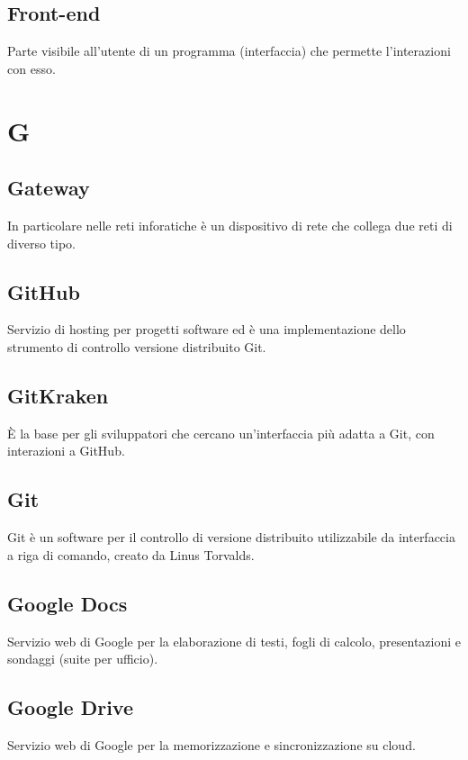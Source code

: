 \documentclass{classes/base}
\begin{document}
        \subsection*{Front-end}
        Parte visibile all'utente di un programma (interfaccia) che permette l'interazioni con esso.
        
        \newpage  
    \section{G}
        
        \subsection*{Gateway}
        In particolare nelle reti inforatiche è un dispositivo di rete che collega due reti di diverso tipo.

        \subsection*{GitHub}
        Servizio di hosting per progetti software ed è una implementazione dello strumento di controllo versione distribuito Git.

        \subsection*{GitKraken}
        È la base per gli sviluppatori che cercano un'interfaccia più adatta a Git, con interazioni a GitHub. 

        \subsection*{Git}
        Git è un software per il controllo di versione distribuito utilizzabile da interfaccia a riga di comando, creato da Linus Torvalds.
        
        \subsection*{Google Docs}
        Servizio web di Google per la elaborazione di testi, fogli di calcolo, presentazioni e sondaggi (suite per ufficio).
        
        \subsection*{Google Drive}
        Servizio web di Google per la memorizzazione e sincronizzazione su cloud.
\end{document}
